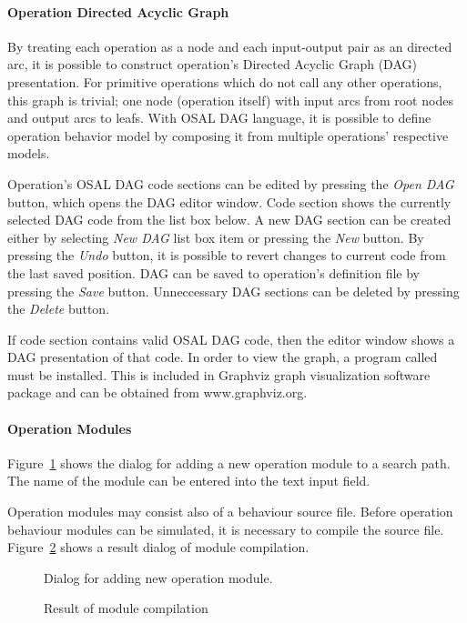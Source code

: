 \documentclass[twoside]{tceusermanual}
\begin{document}
\paragraph{Operation Directed Acyclic Graph}

By treating each operation as a node and each input-output pair as an directed
arc, it is possible to construct operation's Directed Acyclic Graph (DAG)
presentation. For primitive operations which do not call any other operations,
this graph is trivial; one node (operation itself) with input arcs from root
nodes and output arcs to leafs. With OSAL DAG language, it is possible to
define operation behavior model by composing it from multiple operations'
respective models.

Operation's OSAL DAG code sections can be edited by pressing the \emph{Open DAG}
button, which opens the DAG editor window. Code section shows the currently
selected DAG code from the list box below. A new DAG section can be created
either by selecting \emph{New DAG} list box item or pressing the \emph{New} button.
By pressing the \emph{Undo} button, it is possible to revert changes to current
code from the last saved position. DAG can be saved to operation's definition
file by pressing the \emph{Save} button. Unneccessary DAG sections can be deleted
by pressing the \emph{Delete} button.

If code section contains valid OSAL DAG code, then the editor window shows
a DAG presentation of that code.  In order to view the graph, a
program called  must be installed. This is included in Graphviz graph
visualization software package and can be obtained from www.graphviz.org. 

\paragraph{Operation Modules}

Figure~\ref{fig:osed_add_module_dialog} shows the dialog for adding a new
operation module to a search path. The name of the module can be entered
into the text input field.  

Operation modules may consist also of a behaviour source file. Before
operation behaviour modules can be simulated, it is necessary to compile the
source file.  Figure~\ref{fig:osed_build_result_dialog} shows a result dialog of
module compilation. 

%
\begin{figure}[tb]
\centerline{}
\caption{Dialog for adding new operation module.}
\label{fig:osed_add_module_dialog}
\end{figure}
%
\begin{figure}[tb]
\centerline{}
\caption{Result of module compilation}
\label{fig:osed_build_result_dialog}
\end{figure}
\end{document}
